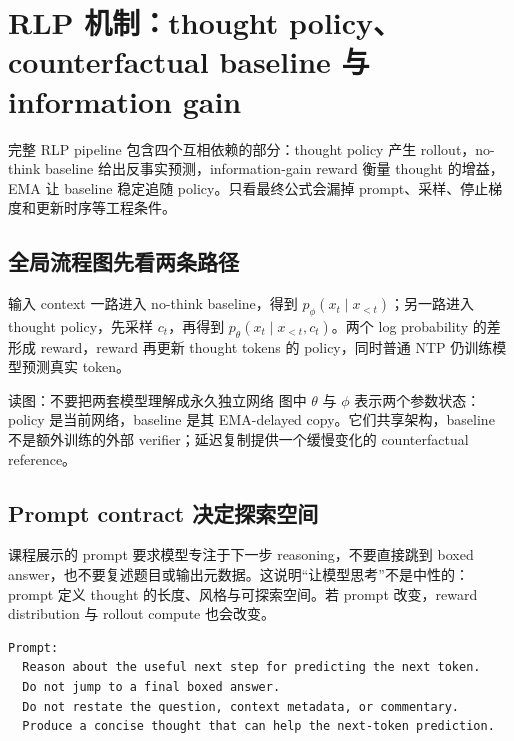 \section{RLP 机制：thought policy、counterfactual baseline 与 information gain}

完整 RLP pipeline 包含四个互相依赖的部分：thought policy 产生 rollout，no-think baseline 给出反事实预测，information-gain reward 衡量 thought 的增益，EMA 让 baseline 稳定追随 policy。只看最终公式会漏掉 prompt、采样、停止梯度和更新时序等工程条件。

\subsection{全局流程图先看两条路径}

输入 context 一路进入 no-think baseline，得到 $p_\phi(x_t\mid x_{<t})$；另一路进入 thought policy，先采样 $c_t$，再得到 $p_\theta(x_t\mid x_{<t},c_t)$。两个 log probability 的差形成 reward，reward 再更新 thought tokens 的 policy，同时普通 NTP 仍训练模型预测真实 token。


\begin{knowledgebox}{读图：不要把两套模型理解成永久独立网络}
图中 $\theta$ 与 $\phi$ 表示两个参数状态：policy 是当前网络，baseline 是其 EMA-delayed copy。它们共享架构，baseline 不是额外训练的外部 verifier；延迟复制提供一个缓慢变化的 counterfactual reference。
\end{knowledgebox}

\subsection{Prompt contract 决定探索空间}

课程展示的 prompt 要求模型专注于下一步 reasoning，不要直接跳到 boxed answer，也不要复述题目或输出元数据。这说明“让模型思考”不是中性的：prompt 定义 thought 的长度、风格与可探索空间。若 prompt 改变，reward distribution 与 rollout compute 也会改变。


\begin{lstlisting}[caption={RLP thought prompt 的简化教学版}]
Prompt:
  Reason about the useful next step for predicting the next token.
  Do not jump to a final boxed answer.
  Do not restate the question, context metadata, or commentary.
  Produce a concise thought that can help the next-token prediction.
\end{lstlisting}

